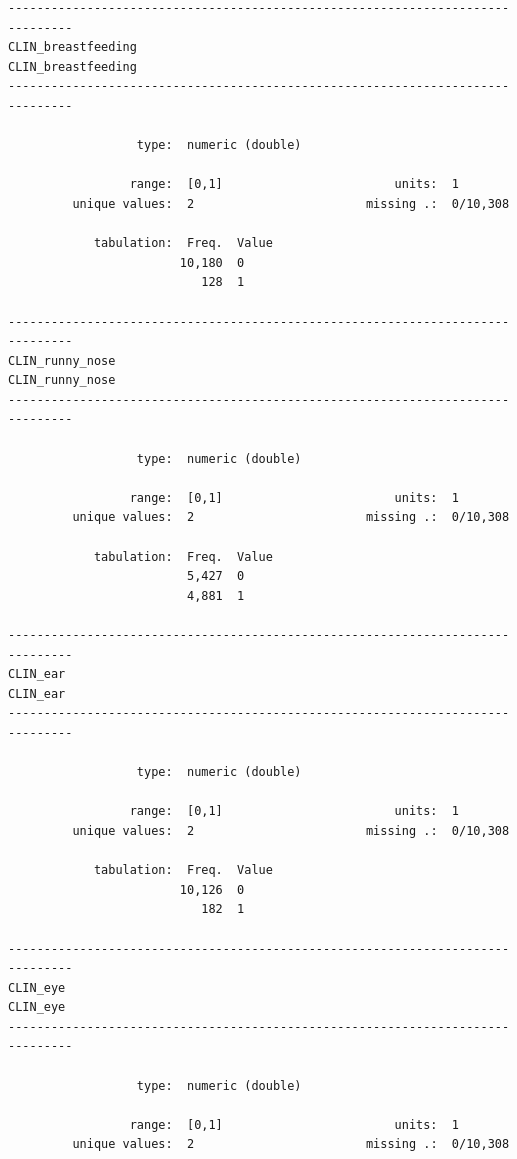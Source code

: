 \documentclass[
  letterpaper,
  DIV=11,
  numbers=noendperiod]{scrreprt}
\begin{document}
\begin{verbatim}
-------------------------------------------------------------------------------
CLIN_breastfeeding                                           CLIN_breastfeeding
-------------------------------------------------------------------------------

                  type:  numeric (double)

                 range:  [0,1]                        units:  1
         unique values:  2                        missing .:  0/10,308

            tabulation:  Freq.  Value
                        10,180  0
                           128  1

-------------------------------------------------------------------------------
CLIN_runny_nose                                                 CLIN_runny_nose
-------------------------------------------------------------------------------

                  type:  numeric (double)

                 range:  [0,1]                        units:  1
         unique values:  2                        missing .:  0/10,308

            tabulation:  Freq.  Value
                         5,427  0
                         4,881  1

-------------------------------------------------------------------------------
CLIN_ear                                                               CLIN_ear
-------------------------------------------------------------------------------

                  type:  numeric (double)

                 range:  [0,1]                        units:  1
         unique values:  2                        missing .:  0/10,308

            tabulation:  Freq.  Value
                        10,126  0
                           182  1

-------------------------------------------------------------------------------
CLIN_eye                                                               CLIN_eye
-------------------------------------------------------------------------------

                  type:  numeric (double)

                 range:  [0,1]                        units:  1
         unique values:  2                        missing .:  0/10,308


\end{verbatim}
\end{document}
